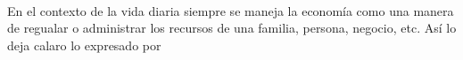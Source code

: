 
\justify
\fontsize{12pt}{14}\
\setlength{\parindent}{0cm}

\normalsize En el contexto de la vida diaria siempre se maneja la economía como una manera de regualar o administrar los recursos de una familia, persona, negocio, etc. Así lo deja calaro lo expresado por \cite{economia1}

